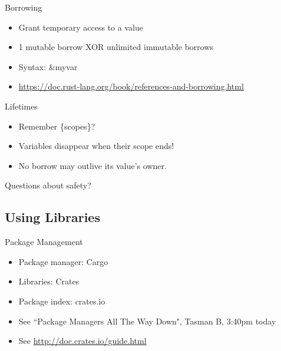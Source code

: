 \documentclass[aspectratio=169]{beamer}
\begin{document}
\begin{frame}
    Borrowing
    \begin{itemize}
        \item Grant temporary access to a value
        \item 1 mutable borrow XOR unlimited immutable borrows
        \item Syntax: \&myvar
        \item \url{https://doc.rust-lang.org/book/references-and-borrowing.html}
    \end{itemize}
\end{frame}

\begin{frame}
    Lifetimes
    \begin{itemize}
        \item Remember \{scopes\}?
        \item Variables disappear when their scope ends!
        \item No borrow may outlive its value's owner.
    \end{itemize}
\end{frame}
\begin{frame}
    \hfill Questions about safety?
\end{frame}


\subsection{Using Libraries}

\begin{frame}
    Package Management
    \begin{itemize}
        \item Package manager: Cargo
        \item Libraries: Crates
        \item Package index: crates.io
        \item See ``Package Managers All The Way Down", Tasman B, 3:40pm today
        \item See \url{http://doc.crates.io/guide.html}
    \end{itemize}
\end{frame}
\end{document}
